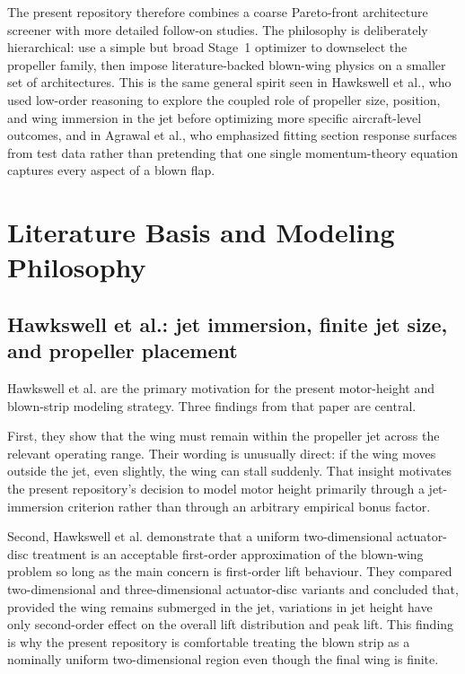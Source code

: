 \documentclass[conf]{new-aiaa}
\begin{document}
The present repository therefore combines a coarse Pareto-front architecture screener with more detailed follow-on studies. The philosophy is deliberately hierarchical: use a simple but broad Stage~1 optimizer to downselect the propeller family, then impose literature-backed blown-wing physics on a smaller set of architectures. This is the same general spirit seen in Hawkswell et al., who used low-order reasoning to explore the coupled role of propeller size, position, and wing immersion in the jet before optimizing more specific aircraft-level outcomes,\cite{Hawkswell2022} and in Agrawal et al., who emphasized fitting section response surfaces from test data rather than pretending that one single momentum-theory equation captures every aspect of a blown flap.\cite{Agrawal2019}

\section{Literature Basis and Modeling Philosophy}

\subsection{Hawkswell et al.: jet immersion, finite jet size, and propeller placement}

Hawkswell et al. are the primary motivation for the present motor-height and blown-strip modeling strategy.\cite{Hawkswell2022} Three findings from that paper are central.

First, they show that the wing must remain within the propeller jet across the relevant operating range. Their wording is unusually direct: if the wing moves outside the jet, even slightly, the wing can stall suddenly.\cite{Hawkswell2022} That insight motivates the present repository's decision to model motor height primarily through a jet-immersion criterion rather than through an arbitrary empirical bonus factor.

Second, Hawkswell et al. demonstrate that a uniform two-dimensional actuator-disc treatment is an acceptable first-order approximation of the blown-wing problem so long as the main concern is first-order lift behaviour. They compared two-dimensional and three-dimensional actuator-disc variants and concluded that, provided the wing remains submerged in the jet, variations in jet height have only second-order effect on the overall lift distribution and peak lift.\cite{Hawkswell2022} This finding is why the present repository is comfortable treating the blown strip as a nominally uniform two-dimensional region even though the final wing is finite.
\end{document}

